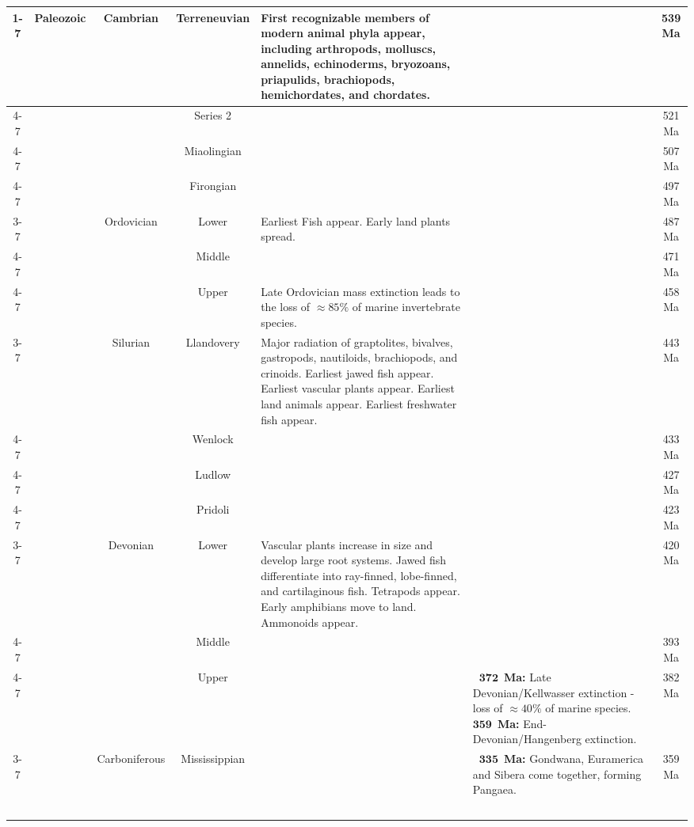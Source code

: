 \documentclass[border=50pt]{standalone}
\newcommand{\tabitem}[2]{\textbf{\textemdash~}$\mathbf{#1}$~\textbf{#2:}}
\begin{document}
\begin{tabular}{|c|c|c|c|p{5cm}|p{10cm}|c|}
		\cline{1-7}
		\multirow{34}{*}{Phanerozoic} & \multirow{19}{*}{Paleozoic} & \multirow{4}{*}{Cambrian} & Terreneuvian 
		& 
		First recognizable members of modern animal phyla appear, including arthropods, molluscs, annelids, echinoderms, bryozoans, priapulids, brachiopods, hemichordates, and chordates.
		& 
		& 539 Ma\\
		\cline{4-7} 
		&&& Series 2 & & & 521 Ma\\
		\cline{4-7} 
		&&& Miaolingian & & & 507 Ma\\
		\cline{4-7} 
		&&& Firongian & & & 497 Ma\\
		\cline{3-7} 
		&& \multirow{3}{*}{Ordovician} & Lower 
		& 
		Earliest Fish appear. Early land plants spread.
		& 
		& 487 Ma\\
		\cline{4-7} 
		&&& Middle & & & 471 Ma\\
		\cline{4-7} 
		&
		&
		& 
		Upper  
		& 
		Late Ordovician mass extinction leads to the loss of $\approx 85\%$ of marine invertebrate species.
		& 
		& 
		458 Ma\\
		\cline{3-7} 
		&& \multirow{4}{*}{Silurian} & Llandovery 
		& 
		Major radiation of graptolites, bivalves, gastropods, nautiloids, brachiopods, and crinoids. Earliest jawed fish appear. Earliest vascular plants appear. Earliest land animals appear. Earliest freshwater fish appear.
		& 
		& 
		443 Ma\\
		\cline{4-7} 
		&&& Wenlock & & & 433 Ma\\
		\cline{4-7} 
		&&& Ludlow & & & 427 Ma\\
		\cline{4-7} 
		&&& Pridoli & & & 423 Ma\\
		\cline{3-7} 
		&& \multirow{3}{*}{Devonian} & Lower 
		& 
		Vascular plants increase in size and develop large root systems. Jawed fish differentiate into ray-finned, lobe-finned, and cartilaginous fish. Tetrapods appear. Early amphibians move to land. Ammonoids appear.
		& 
		& 
		420 Ma\\
		\cline{4-7} 
		&&& Middle & & & 393 Ma\\
		\cline{4-7} 
		&&& Upper 
		& 
		& 
		\tabitem{372}{Ma} Late Devonian/Kellwasser extinction - loss of $\approx$$40\%$ of marine species.\newline
		\tabitem{359}{Ma} End-Devonian/Hangenberg extinction.
		& 382 Ma\\
		\cline{3-7} 
		&& \multirow{2}{*}{Carboniferous} & Mississippian 
		& 
		& 
		\tabitem{335}{Ma} Gondwana, Euramerica and Sibera come together, forming Pangaea.
		& 359 Ma\\
$$
\end{tabular}
\end{document}
